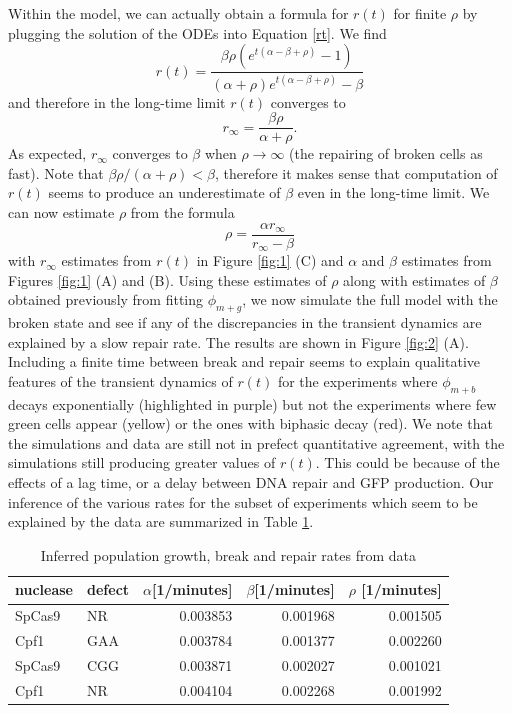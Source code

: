 \documentclass{article}
\begin{document}
Within the model, we can actually obtain a formula for $r(t)$ for finite $\rho$ by plugging the solution of the ODEs into Equation \ref{rt}. We find
\begin{equation}
r(t) =\frac{\beta  \rho  \left(e^{t (\alpha -\beta +\rho )}-1\right)}{(\alpha +\rho ) e^{t (\alpha -\beta +\rho )}-\beta } 
\end{equation}
and therefore in the long-time limit $r(t)$ converges to 
\begin{equation}
r_{\infty} = \frac{\beta \rho}{\alpha+\rho}.
\end{equation}
As expected, $r_{\infty}$ converges to $\beta$ when $\rho \to \infty$ (the repairing of broken cells as fast). Note that $\beta \rho/(\alpha+\rho) < \beta$, therefore it makes sense that computation of $r(t)$ seems to produce an underestimate of $\beta$ even in the long-time limit.  We can now estimate $\rho$ from the formula 
\begin{equation}
\rho = \frac{\alpha r_{\infty}}{r_{\infty} - \beta}
\end{equation}
with $r_{\infty}$ estimates from $r(t)$ in Figure \ref{fig:1} (C) and $\alpha$ and $\beta$ estimates from Figures \ref{fig:1} (A) and (B). 
Using these estimates of $\rho$ along with estimates of $\beta$ obtained previously from fitting $\phi_{m+g}$, we now simulate the full model with the broken state and see if any of the discrepancies in the transient dynamics are explained by a slow repair rate. The results are shown in Figure \ref{fig:2} (A). Including a finite time between break and repair seems to explain qualitative features of the transient dynamics of $r(t)$ for the experiments where $\phi_{m+b}$ decays exponentially (highlighted in purple) but not the experiments where few green cells appear (yellow) or the ones with biphasic decay (red). We note that the simulations and data are still not in prefect quantitative agreement, with the simulations still producing greater values of $r(t)$. This could be because of the effects of a lag time, or a delay between DNA repair and GFP production. Our inference of the various rates for the subset of experiments which seem to be explained by the data are summarized in Table \ref{tab:1}.

\begin{table}
\begin{center}
\begin{tabular}{l|l|r|r|r}
 nuclease & defect &     $\alpha$[1/minutes] &      $\beta$[1/minutes] &      $\rho$ [1/minutes]\\
\hline
SpCas9 &     NR &  0.003853 &  0.001968 &  0.001505 \\
 Cpf1 &   GAA  &  0.003784 &  0.001377 &  0.002260 \\
SpCas9 &    CGG &  0.003871 &  0.002027 &  0.001021 \\
Cpf1 &     NR &  0.004104 &  0.002268 &  0.001992 \\
\end{tabular}
\caption{Inferred population growth, break and repair rates from data}\label{tab:1}
\end{center}
\end{table}
\end{document}
